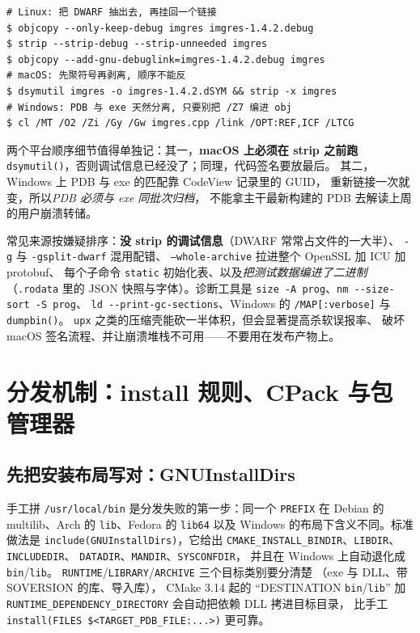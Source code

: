 \documentclass[12pt,a4paper,fontset=fandol]{ctexbook}
\newcommand{\Fn}[1]{\texttt{#1()}}
\newcommand{\Tp}[1]{\texttt{#1}}
\newcommand{\Bk}{\allowbreak}
\begin{document}
\begin{lstlisting}[style=shellstyle,caption={三平台的``一次构建、两份产物''命令}]
# Linux: 把 DWARF 抽出去, 再挂回一个链接
$ objcopy --only-keep-debug imgres imgres-1.4.2.debug
$ strip --strip-debug --strip-unneeded imgres
$ objcopy --add-gnu-debuglink=imgres-1.4.2.debug imgres
# macOS: 先聚符号再剥离, 顺序不能反
$ dsymutil imgres -o imgres-1.4.2.dSYM && strip -x imgres
# Windows: PDB 与 exe 天然分离, 只要别把 /Z7 编进 obj
$ cl /MT /O2 /Zi /Gy /Gw imgres.cpp /link /OPT:REF,ICF /LTCG
\end{lstlisting}

两个平台顺序细节值得单独记：其一，\textbf{macOS 上必须在 strip 之前跑}
\Fn{dsymutil}，否则调试信息已经没了；同理，代码签名要放最后。
其二，Windows 上 PDB 与 exe 的匹配靠 CodeView 记录里的 GUID，
重新链接一次就变，所以\emph{PDB 必须与 exe 同批次归档}，
不能拿主干最新构建的 PDB 去解读上周的用户崩溃转储。

\begin{warning}[title={40 MB 不是 C++ 的必要代价}]
常见来源按嫌疑排序：\textbf{没 strip 的调试信息}（DWARF 常常占文件的一大半）、
\lstinline{-g} 与 \lstinline{-gsplit-dwarf} 混用配错、
\Tp{--whole-archive} 拉进整个 OpenSSL 加 ICU 加 protobuf、
每个子命令 \Tp{static} 初始化表、以及\emph{把测试数据编进了二进制}
（\lstinline{.rodata} 里的 JSON 快照与字体）。诊断工具是
\lstinline|size -A prog|、\lstinline|nm --size-sort -S prog|、
\lstinline|ld --print-gc-sections|、Windows 的
\lstinline|/MAP[:verbose]| 与 \Fn{dumpbin}。
\Tp{upx} 之类的压缩壳能砍一半体积，但会显著提高杀软误报率、
破坏 macOS 签名流程、并让崩溃堆栈不可用——不要用在发布产物上。
\end{warning}

\section{分发机制：install 规则、CPack 与包管理器}

\subsection{先把安装布局写对：GNUInstallDirs}

手工拼 \Tp{/usr/local/bin} 是分发失败的第一步：同一个 \Tp{PREFIX}
在 Debian 的 multilib、Arch 的 \Tp{lib}、Fedora 的 \Tp{lib64}
以及 Windows 的布局下含义不同。标准做法是
\lstinline|include(GNUInstallDirs)|，它给出
\Tp{CMAKE\Bk\_INSTALL\Bk\_BINDIR}、\Tp{LIBDIR}、\Tp{INCLUDEDIR}、
\Tp{DATADIR}、\Tp{MANDIR}、\Tp{SYSCONFDIR}，
并且在 Windows 上自动退化成 \Tp{bin}/{\Bk}\Tp{lib}。
\Tp{RUNTIME}/{\Bk}\Tp{LIBRARY}/{\Bk}\Tp{ARCHIVE} 三个目标类别要分清楚
（exe 与 DLL、带 SOVERSION 的库、导入库），
CMake 3.14 起的 ``DESTINATION \Tp{bin}/{\Bk}\Tp{lib}''
加 \Tp{RUNTIME\_DEPENDENCY\_DIRECTORY} 会自动把依赖 DLL 拷进目标目录，
比手工 \lstinline|install(FILES $<TARGET_PDB_FILE:...>)| 更可靠。
\end{document}
